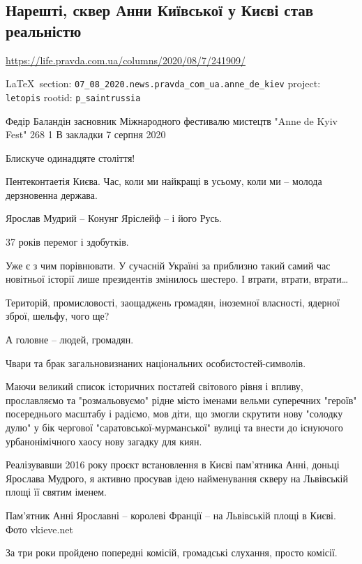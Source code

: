  
 
\subsection{Нарешті, сквер Анни Київської у Києві став реальністю}
\url{https://life.pravda.com.ua/columns/2020/08/7/241909/}
  
\vspace{0.5cm}
 {\ifDEBUG\small\LaTeX~section: \verb|07_08_2020.news.pravda_com_ua.anne_de_kiev| project: \verb|letopis| rootid: \verb|p_saintrussia| \fi}
\vspace{0.5cm}

Федір Баландін засновник Міжнародного фестивалю мистецтв "Anne de Kyiv Fest"
268 1 В закладки 7 серпня 2020

Блискуче одинадцяте століття!

Пентеконтаетія Києва. Час, коли ми найкращі в усьому, коли ми – молода
дерзновенна держава.

Ярослав Мудрий – Конунг Яріслейф – і його Русь.

37 років перемог і здобутків.

Уже є з чим порівнювати. У сучасній Україні за приблизно такий самий час
новітньої історії лише президентів змінилось шестеро. І втрати, втрати, втрати…

Територій, промисловості, заощаджень громадян, іноземної власності, ядерної
зброї, шельфу, чого ще?

А головне – людей, громадян.

Чвари та брак загальновизнаних національних особистостей-символів.

Маючи великий список історичних постатей світового рівня і впливу, прославляємо
та "розмальовуємо" рідне місто іменами вельми суперечних "героїв" посереднього
масштабу і радіємо, мов діти, що змогли скрутити нову "солодку дулю" у бік
чергової "саратовської-мурманської" вулиці та внести до існуючого
урбанонімічного хаосу нову загадку для киян.

Реалізувавши 2016 року проєкт встановлення в Києві пам’ятника Анні, доньці
Ярослава Мудрого, я активно просував ідею найменування скверу на Львівській
площі її святим іменем.

Пам'ятник Анні Ярославні – королеві Франції – на Львівській площі в Києві.  Фото
vkieve.net

За три роки пройдено попередні комісій, громадські слухання, просто комісії.

